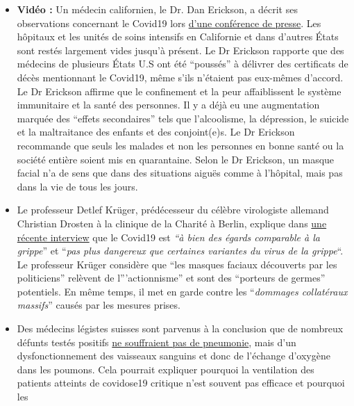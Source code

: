 \begin{itemize}
\tightlist
\item
  \textbf{Vidéo :} Un médecin californien, le Dr. Dan Erickson, a décrit
  ses observations concernant le Covid19 lors
  \href{https://www.turnto23.com/news/coronavirus/video-interview-with-dr-dan-erickson-and-dr-artin-massihi-taken-down-from-youtube}{d'une
  conférence de presse}. Les hôpitaux et les unités de soins intensifs
  en Californie et dans d'autres États sont restés largement vides
  jusqu'à présent. Le Dr Erickson rapporte que des médecins de plusieurs
  États U.S ont été ``poussés'' à délivrer des certificats de décès
  mentionnant le Covid19, même s'ils n'étaient pas eux-mêmes d'accord.
  Le Dr Erickson affirme que le confinement et la peur affaiblissent le
  système immunitaire et la santé des personnes. Il y a déjà eu une
  augmentation marquée des ``effets secondaires'' tels que l'alcoolisme,
  la dépression, le suicide et la maltraitance des enfants et des
  conjoint(e)s. Le Dr Erickson recommande que seuls les malades et non
  les personnes en bonne santé ou la société entière soient mis en
  quarantaine. Selon le Dr Erickson, un masque facial n'a de sens que
  dans des situations aiguës comme à l'hôpital, mais pas dans la vie de
  tous les jours.
\item
  Le professeur Detlef Krüger, prédécesseur du célèbre virologiste
  allemand Christian Drosten à la clinique de la Charité à Berlin,
  explique dans
  \href{https://de.sputniknews.com/interviews/20200425326953541-corona-gefahr-virologe/}{une
  récente interview} que le Covid19 est \emph{``à bien des égards
  comparable à la grippe}'' et ``\emph{pas plus dangereux que certaines
  variantes du virus de la grippe}``. Le professeur Krüger considère que
  ``les masques faciaux découverts par les politiciens'' relèvent de
  l'''actionnisme'' et sont des ``porteurs de germes'' potentiels. En
  même temps, il met en garde contre les ``\emph{dommages collatéraux
  massifs}'' causés par les mesures prises.
\item
  Des médecins légistes suisses sont parvenus à la conclusion que de
  nombreux défunts testés positifs
  \href{https://www.welt.de/wissenschaft/article207417811/Corona-Tote-In-den-wenigsten-Faellen-eine-Lungenentzuendung.html}{ne
  souffraient pas de pneumonie}, mais d'un dysfonctionnement des
  vaisseaux sanguins et donc de l'échange d'oxygène dans les poumons.
  Cela pourrait expliquer pourquoi la ventilation des patients atteints
  de covidose19 critique n'est souvent pas efficace et pourquoi les

\end{itemize}
